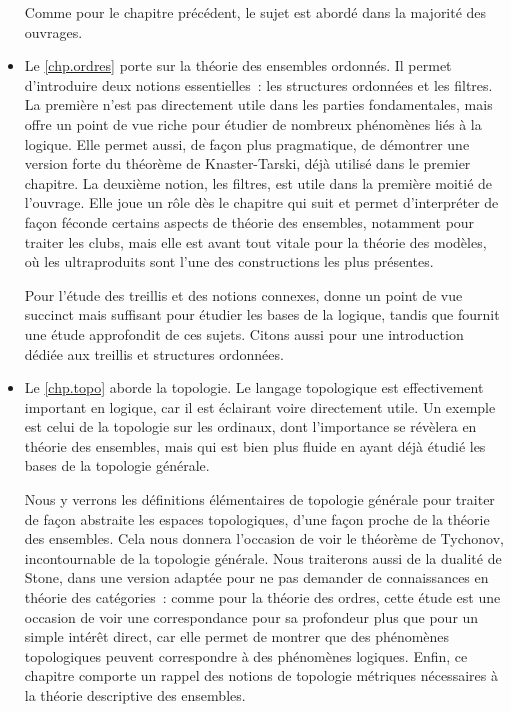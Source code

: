 \begin{itemize}
  Comme pour le chapitre précédent, le sujet est abordé dans la majorité des
  ouvrages.
\item Le \cref{chp.ordres} porte sur la théorie des ensembles ordonnés. Il
  permet d'introduire deux notions essentielles~: les structures ordonnées et
  les filtres. La première n'est pas directement utile dans les parties
  fondamentales, mais offre un point de vue riche pour étudier de nombreux
  phénomènes liés à la logique. Elle permet aussi, de façon plus pragmatique, de
  démontrer une version forte du théorème de Knaster-Tarski, déjà utilisé dans
  le premier chapitre. La deuxième notion, les filtres, est utile dans la
  première moitié de l'ouvrage. Elle joue un rôle dès le chapitre qui suit et
  permet d'interpréter de façon féconde certains aspects de théorie des
  ensembles, notamment pour traiter les clubs, mais elle est avant tout
  vitale pour la théorie des modèles, où les ultraproduits sont l'une des
  constructions les plus présentes.

  Pour l'étude des treillis et des notions connexes, \cite{cori2003logique}
  donne un point de vue succinct mais suffisant pour étudier les bases de la
  logique, tandis que \cite{lattice} fournit une étude approfondit de ces
  sujets. Citons aussi \cite{Rutherford1967-RUTITL} pour une introduction dédiée
  aux treillis et structures ordonnées.
\item Le \cref{chp.topo} aborde la topologie. Le langage topologique est
  effectivement important en logique, car il est éclairant voire directement
  utile. Un exemple est celui de la topologie sur les ordinaux, dont
  l'importance se révèlera en théorie des ensembles, mais qui est bien plus
  fluide en ayant déjà étudié les bases de la topologie générale.

  Nous y verrons les définitions élémentaires de topologie générale pour traiter
  de façon abstraite les espaces topologiques, d'une façon proche de la théorie
  des ensembles. Cela nous donnera l'occasion de voir le théorème de Tychonov,
  incontournable de la topologie générale. Nous traiterons aussi de la dualité
  de Stone, dans une version adaptée pour ne pas demander de connaissances en
  théorie des catégories~: comme pour la théorie des ordres, cette étude est une
  occasion de voir une correspondance pour sa profondeur plus que pour un simple
  intérêt direct, car elle permet de montrer que des phénomènes topologiques
  peuvent correspondre à des phénomènes logiques. Enfin, ce chapitre comporte un
  rappel des notions de topologie métriques nécessaires à la théorie descriptive
  des ensembles.


\end{itemize}
